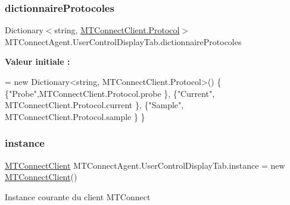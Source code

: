 \subsubsection{\texorpdfstring{dictionnaire\+Protocoles}{dictionnaireProtocoles}}
{\footnotesize\ttfamily Dictionary$<$string, \mbox{\hyperlink{class_m_t_connect_agent_1_1_b_l_l_1_1_m_t_connect_client_a2f390f74a0ad3ee5147e9438ceed6474}{M\+T\+Connect\+Client.\+Protocol}}$>$ M\+T\+Connect\+Agent.\+User\+Control\+Display\+Tab.\+dictionnaire\+Protocoles\hspace{0.3cm}{\ttfamily [private]}}

{\bfseries Valeur initiale \+:}
\begin{DoxyCode}
= \textcolor{keyword}{new} Dictionary<string, MTConnectClient.Protocol>()
        \{
            \{\textcolor{stringliteral}{"Probe"},MTConnectClient.Protocol.probe \},
            \{\textcolor{stringliteral}{"Current"}, MTConnectClient.Protocol.current \},
            \{\textcolor{stringliteral}{"Sample"}, MTConnectClient.Protocol.sample \}
        \}
\end{DoxyCode}
\mbox{\label{class_m_t_connect_agent_1_1_user_control_display_tab_a4bfdc2032bbe24566e9e4d7053438ab1}} 
\subsubsection{\texorpdfstring{instance}{instance}}
{\footnotesize\ttfamily \mbox{\hyperlink{class_m_t_connect_agent_1_1_b_l_l_1_1_m_t_connect_client}{M\+T\+Connect\+Client}} M\+T\+Connect\+Agent.\+User\+Control\+Display\+Tab.\+instance = new \mbox{\hyperlink{class_m_t_connect_agent_1_1_b_l_l_1_1_m_t_connect_client}{M\+T\+Connect\+Client}}()\hspace{0.3cm}{\ttfamily [private]}}



Instance courante du client M\+T\+Connect 

\mbox{\label{class_m_t_connect_agent_1_1_user_control_display_tab_a70ccdb75ebd47abf8cf75656c5318492}} 
